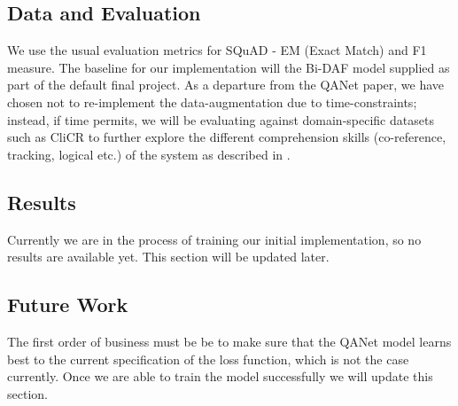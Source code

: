 \documentclass{article}
\begin{document}
\subsection{Data and Evaluation}
We use the usual evaluation metrics for SQuAD - EM (Exact Match) and F1 measure. The baseline for our implementation will the Bi-DAF model supplied as part of the default final project. As a departure from the QANet paper, we have chosen not to re-implement the data-augmentation due to time-constraints; instead, if time permits, we will be evaluating against domain-specific datasets such as CliCR \cite{vsuster2018clicr} to further explore the different comprehension skills (co-reference, tracking, logical etc.) of the system as described in \cite{sugawara2017evaluation}.

\subsection{Results}
Currently we are in the process of training our initial implementation, so no results are available yet. This section will be updated later.

\subsection{Future Work}
The first order of business must be be to make sure that the QANet model learns best to the current specification of the loss function, which is not the case currently.  Once we are able to train the model successfully we will update this section.  



\end{document}
